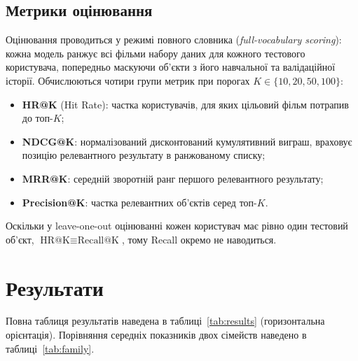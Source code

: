 \documentclass[12pt,a4paper]{article}
\begin{document}
\subsection{Метрики оцінювання}

Оцінювання проводиться у режимі повного словника
(\textit{full-vocabulary scoring}): кожна модель ранжує всі фільми набору
даних для кожного тестового користувача, попередньо маскуючи об'єкти з
його навчальної та валідаційної історії.
Обчислюються чотири групи метрик при порогах $K\!\in\!\{10,20,50,100\}$:

\begin{itemize}
    \item \textbf{HR@K} (Hit Rate): частка користувачів, для яких цільовий
          фільм потрапив до топ-$K$;
    \item \textbf{NDCG@K}: нормалізований дисконтований кумулятивний виграш,
          враховує позицію релевантного результату в ранжованому списку;
    \item \textbf{MRR@K}: середній зворотній ранг першого релевантного
          результату;
    \item \textbf{Precision@K}: частка релевантних об'єктів серед топ-$K$.
\end{itemize}

\noindent Оскільки у leave-one-out оцінюванні кожен користувач має рівно один
тестовий об'єкт, $\text{HR@K}\equiv\text{Recall@K}$, тому Recall окремо
не наводиться.

\section{Результати}

Повна таблиця результатів наведена в таблиці~\ref{tab:results}
(горизонтальна орієнтація).
Порівняння середніх показників двох сімейств наведено в
таблиці~\ref{tab:family}.
\end{document}
